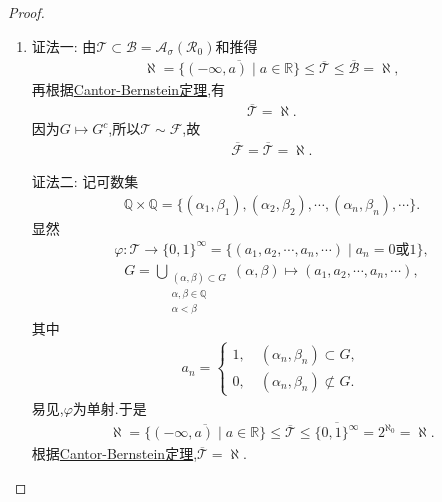 \documentclass[../../main.tex]{subfiles}%
\begin{document}
\begin{proof}
\begin{enumerate}[(1)]
\item {\color{blue}证法一:} 由$\mathscr{T}\subset\mathscr{B}=\mathscr{A}_{\sigma}(\mathscr{R}_0)$和推得
\begin{align*}
\aleph=\overline{\{(-\infty,a)\mid a\in\mathbb{R}\}}\leqslant\overline{\mathscr{T}}\leqslant\overline{\mathscr{B}}=\aleph,
\end{align*}
再根据\hyperref[Set-Theory-theorem:Cantor-Bernstein定理]{Cantor-Bernstein定理},有
\begin{align*}
\overline{\mathscr{T}}=\aleph.
\end{align*}
因为$G\mapsto G^c$,所以$\mathscr{T}\sim\mathscr{F}$,故
\begin{align*}
\overline{\mathscr{F}}=\overline{\mathscr{T}}=\aleph.
\end{align*}

{\color{blue}证法二:} 记可数集
\begin{align*}
\mathbb{Q}\times\mathbb{Q}=\{(\alpha_1,\beta_1),(\alpha_2,\beta_2),\cdots,(\alpha_n,\beta_n),\cdots\}.
\end{align*}
显然
\begin{align*}
\varphi:\mathscr{T}\to\{0,1\}^{\infty}=\{(a_1,a_2,\cdots,a_n,\cdots)\mid a_n=0\text{或}1\},
\end{align*}
\begin{align*}
G=\bigcup\limits_{\substack{(\alpha,\beta)\subset G\\ \alpha,\beta\in\mathbb{Q}\\ \alpha<\beta}}(\alpha,\beta)\mapsto(a_1,a_2,\cdots,a_n,\cdots),
\end{align*}
其中
\begin{align*}
a_n=\begin{cases}
1,\quad (\alpha_n,\beta_n)\subset G,\\
0,\quad (\alpha_n,\beta_n)\not\subset G.
\end{cases}
\end{align*}
易见,$\varphi$为单射.于是
\begin{align*}
\aleph=\overline{\{(-\infty,a)\mid a\in\mathbb{R}\}}\leqslant\overline{\mathscr{T}}\leqslant\overline{\{0,1\}^{\infty}}=2^{\aleph_0}=\aleph.
\end{align*}
根据\hyperref[Set-Theory-theorem:Cantor-Bernstein定理]{Cantor-Bernstein定理},$\overline{\mathscr{T}}=\aleph$.


\end{enumerate}
\end{proof}
\end{document}
